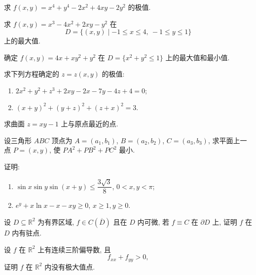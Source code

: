 \documentclass[../数学分析培优讲义.tex]{subfiles}
\begin{document}
\begin{example}
求 $f(x,y)=x^4+y^4-2x^2+4xy-2y^2$ 的极值.
\end{example}
\exampleblank

\begin{example}
求 $f(x,y)=x^3-4x^2+2xy-y^2$ 在
\[
    D=\{(x,y)\mid -1\leq x\leq4,\ -1\leq y\leq1\}
\]
上的最大值.
\end{example}
\exampleblank

\begin{example}
确定 $f(x,y)=4x+xy^2+y^2$ 在 $D=\{x^2+y^2\leq1\}$ 上的最大值和最小值.
\end{example}
\exampleblank

\begin{example}
求下列方程确定的 $z=z(x,y)$ 的极值:
\begin{enumerate}[label=(\arabic*)]
    \item $2x^2+y^2+z^3+2xy-2x-7y-4z+4=0$;
    \item $(x+y)^2+(y+z)^2+(z+x)^2=3$.
\end{enumerate}
\end{example}
\exampleblank

\begin{example}
求曲面 $z=xy-1$ 上与原点最近的点.
\end{example}
\exampleblank

\begin{example}
设三角形 $ABC$ 顶点为 $A=(a_1,b_1)$, $B=(a_2,b_2)$, $C=(a_3,b_3)$, 求平面上一点 $P=(x,y)$, 使 $PA^2+PB^2+PC^2$ 最小.
\end{example}
\exampleblank

\begin{example}
证明:
\begin{enumerate}[label=(\arabic*)]
    \item $\sin x\sin y\sin(x+y)\leq\dfrac{3\sqrt3}{8}$, $0<x,y<\pi$;
    \item $e^y+x\ln x-x-xy\geq0$, $x\geq1,y\geq0$.
\end{enumerate}
\end{example}
\exampleblank

\begin{example}
设 $D\subseteq\mathbb{R}^2$ 为有界区域, $f\in C(\overline D)$ 且在 $D$ 内可微, 若 $f\equiv C$ 在 $\partial D$ 上, 证明 $f$ 在 $D$ 内有驻点.
\end{example}
\exampleblank

\begin{example}
设 $f$ 在 $\mathbb{R}^2$ 上有连续三阶偏导数, 且
\[
    f_{xx}+f_{yy}>0,
\]
证明 $f$ 在 $\mathbb{R}^2$ 内没有极大值点.
\end{example}
\exampleblank
\end{document}
